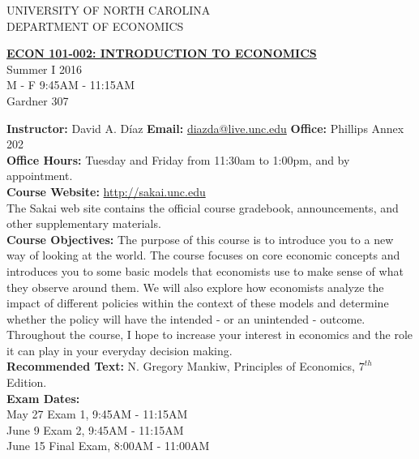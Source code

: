 \documentclass[11pt]{article}
\begin{document}
\begin{center} UNIVERSITY OF NORTH CAROLINA\\
DEPARTMENT OF ECONOMICS \\
\end{center}

\begin{center}\textbf{{\hspace{-.05in}}
\underline{ECON 101-002: INTRODUCTION TO ECONOMICS}}
\\ Summer I 2016
\\ M - F 9:45AM - 11:15AM
\\ Gardner 307
\end{center}


\textbf{Instructor:} David A. D\'iaz \hspace{4.5cm} \textbf{Email:} \url{diazda@live.unc.edu}
\textbf{Office:} Phillips Annex 202 \\
\textbf{Office Hours:} Tuesday and Friday from 11:30am to 1:00pm, and by appointment.\\
\textbf{Course Website:} \url{http://sakai.unc.edu} \\
The Sakai web site contains the official course gradebook, announcements, and other supplementary materials.\\

\textbf{Course Objectives:} The purpose of this course is to introduce you to a new way of looking at the world. The course focuses on core economic concepts and introduces you to some basic models that economists use to make sense of what they observe around them. We will also explore how economists analyze the impact of different policies within the context of these models and determine whether the policy will have the intended - or an unintended - outcome. Throughout the course, I hope to increase your interest in economics and the role it can play in your everyday decision making.
\\

\textbf{Recommended Text:} N. Gregory Mankiw, Principles of Economics, $7^{th}$ Edition.\\

\textbf{Exam Dates:} \\
May 27  \hspace{3.07cm} Exam 1, 9:45AM - 11:15AM  \\
June 9  \hspace{3.2cm} Exam 2, 9:45AM - 11:15AM \\
June 15 \hspace{3cm} Final Exam, 8:00AM - 11:00AM \\
 
\end{document}
